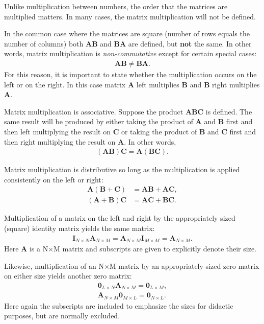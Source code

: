 Unlike multiplication between numbers, the order that the matrices are multiplied matters. In many cases, the matrix multiplication will not be defined. 

In the common case where the matrices are square (number of rows equals the number of columns) both $\mathbf{AB}$ and $\mathbf{BA}$ are defined, but {\bf not} the same. In other words, matrix multiplication is \emph{non-commutative} except for certain special cases:
\begin{align}
  \mathbf{AB} \ne \mathbf{BA}.
\end{align}
For this reason, it is important to state whether the multiplication occurs on the left or on the right. In this case matrix $\mathbf{A}$ left multiplies $\mathbf{B}$ and $\mathbf{B}$ right multiplies $\mathbf{A}$.

Matrix multiplication is associative. Suppose the product $\mathbf{ABC}$ is defined. The same result will be produced by either taking the product of $\mathbf{A}$ and $\mathbf{B}$ first and then left multiplying the result on $\mathbf{C}$ or taking the product of $\mathbf{B}$ and $\mathbf{C}$ first and then right multiplying the result on $\mathbf{A}$. In other words,
\begin{align}
  ( \mathbf{AB} ) \mathbf{C} = \mathbf{A} ( \mathbf{BC} ) .
\end{align}

Matrix multiplication is distributive so long as the multiplication is applied consistently on the left or right:
\begin{subequations}
\begin{align}
  \mathbf{A} ( \mathbf{B} + \mathbf{C} ) &= \mathbf{AB} + \mathbf{AC}, \\
  ( \mathbf{A} + \mathbf{B} ) \mathbf{C} &= \mathbf{AC} + \mathbf{BC}. 
\end{align}
\end{subequations}

Multiplication of a matrix on the left and right by the appropriately sized (square) identity matrix yields the same matrix:
\begin{align}
  \mathbf{I}_{N \times N} \mathbf{A}_{N \times M} = \mathbf{A}_{N \times M} \mathbf{I}_{M \times M} = \mathbf{A}_{N \times M}.
\end{align}
Here $\mathbf{A}$ is a N$\times$M matrix and subscripts are given to explicitly denote their size.

Likewise, multiplication of an N$\times$M matrix by an appropriately-sized zero matrix on either size yields another zero matrix:
\begin{subequations}
\begin{align}
  \mathbf{0}_{L \times N} \mathbf{A}_{N \times M} = \mathbf{0}_{L \times M}, \\
  \mathbf{A}_{N \times M} \mathbf{0}_{M \times L} = \mathbf{0}_{N \times L}.
\end{align}
\end{subequations}
Here again the subscripts are included to emphasize the sizes for didactic purposes, but are normally excluded.


